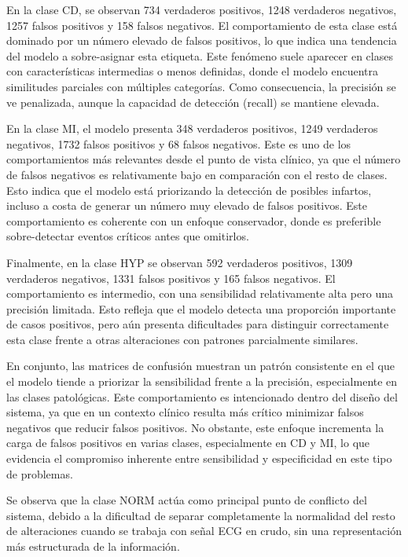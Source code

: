 \documentclass[12pt,a4paper,twoside]{book}
\begin{document}
En la clase CD, se observan 734 verdaderos positivos, 1248 verdaderos negativos, 1257 falsos positivos y 158 falsos negativos. 
El comportamiento de esta clase está dominado por un número elevado de falsos positivos, lo que indica una tendencia del modelo a sobre-asignar esta etiqueta. 
Este fenómeno suele aparecer en clases con características intermedias o menos definidas, donde el modelo encuentra similitudes parciales con múltiples categorías. 
Como consecuencia, la precisión se ve penalizada, aunque la capacidad de detección (recall) se mantiene elevada.

En la clase MI, el modelo presenta 348 verdaderos positivos, 1249 verdaderos negativos, 1732 falsos positivos y 68 falsos negativos. 
Este es uno de los comportamientos más relevantes desde el punto de vista clínico, ya que el número de falsos negativos es relativamente bajo en comparación con el resto de clases. 
Esto indica que el modelo está priorizando la detección de posibles infartos, incluso a costa de generar un número muy elevado de falsos positivos. 
Este comportamiento es coherente con un enfoque conservador, donde es preferible sobre-detectar eventos críticos antes que omitirlos.

Finalmente, en la clase HYP se observan 592 verdaderos positivos, 1309 verdaderos negativos, 1331 falsos positivos y 165 falsos negativos. 
El comportamiento es intermedio, con una sensibilidad relativamente alta pero una precisión limitada. 
Esto refleja que el modelo detecta una proporción importante de casos positivos, pero aún presenta dificultades para distinguir correctamente esta clase frente a otras alteraciones con patrones parcialmente similares.

En conjunto, las matrices de confusión muestran un patrón consistente en el que el modelo tiende a priorizar la sensibilidad frente a la precisión, especialmente en las clases patológicas. Este comportamiento es intencionado dentro del diseño del sistema, ya que en un contexto clínico resulta más crítico minimizar falsos negativos que reducir falsos positivos. 
No obstante, este enfoque incrementa la carga de falsos positivos en varias clases, especialmente en CD y MI, lo que evidencia el compromiso inherente entre sensibilidad y especificidad en este tipo de problemas.

Se observa que la clase NORM actúa como principal punto de conflicto del sistema, debido a la dificultad de separar completamente la normalidad del resto de alteraciones cuando se trabaja con señal ECG en crudo, sin una representación más estructurada de la información.
\end{document}
